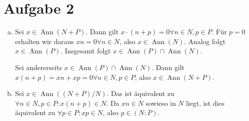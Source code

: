 \documentclass{article}
\newcommand{\ann}{\operatorname{Ann}}
\begin{document}
    \section*{Aufgabe 2}
    \begin{enumerate}[(a)]
        \item Sei $x \in \ann(N + P)$. Dann gilt $x \cdot (n + p) = 0 \forall n \in N, p \in P$. Für $p = 0$ erhalten wir daraus $xn = 0 \forall n \in N$, also $x \in \ann(N)$. Analog folgt $x \in \ann(P)$. Insgesamt folgt $x \in \ann(P) \cap \ann(N)$.
        
        Sei andererseits $x \in \ann(P) \cap \ann(N)$. Dann gilt $x(n+p) = xn + xp = 0 \forall n\in N, p \in P$, also $x \in \ann(N+P)$.
        \item 
        Sei $x \in \ann((N + P)/N)$. Das ist äquivalent zu $\forall n \in N, p \in P:x (n+p) \in N$. Da $xn \in N$ sowieso in $N$ liegt, ist dies äquivalent zu $\forall p \in P: xp \in N$, also $p \in (N:P)$.
    \end{enumerate}
\end{document}
